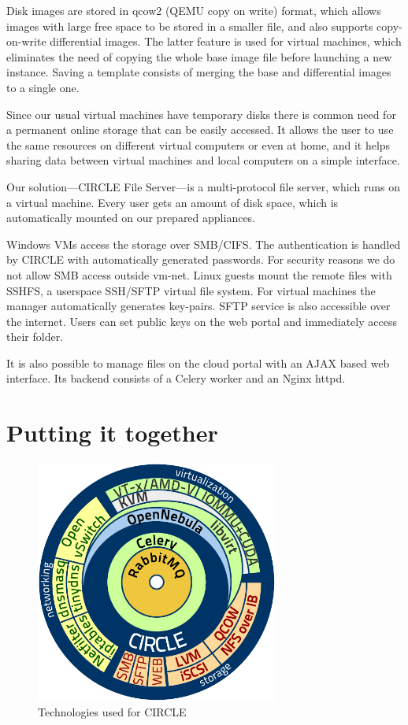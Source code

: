 \documentclass{llncs}
\begin{document}
Disk images are stored in qcow2 (QEMU copy on write) format, which allows images with large free space to be stored in a smaller file, and also supports copy-on-write differential images. The latter feature is used for virtual machines, which eliminates the need of copying the whole base image file before launching a new instance. Saving a template consists of merging the base and differential images to a single one.

Since our usual virtual machines have temporary disks there is common need for a permanent online storage that can be easily accessed. It allows the user to use the same resources on different virtual computers or even at home, and it helps sharing data between virtual machines and local computers on a simple interface.

Our solution---CIRCLE File Server---is a multi-protocol file server, which runs on a virtual machine. Every user gets an amount of disk space, which is automatically mounted on our prepared appliances.

Windows VMs access the storage over SMB/CIFS. The authentication is handled by CIRCLE with automatically generated passwords. For security reasons we do not allow SMB access outside vm-net.
Linux guests mount the remote files with SSHFS\cite{hoskins2006sshfs}, a userspace SSH/SFTP virtual file system. For virtual machines the manager automatically generates key-pairs. SFTP service is also accessible over the internet. Users can set public keys on the web portal and immediately access their folder.

It is also possible to manage files on the cloud portal with an AJAX based web interface. Its backend consists of a Celery worker and an Nginx httpd.

\section{Putting it together}
\begin{figure}[ht]
    \centering
    \includegraphics[width=8cm]{swarch}
    \caption{Technologies used for CIRCLE}
\end{figure}
\end{document}
